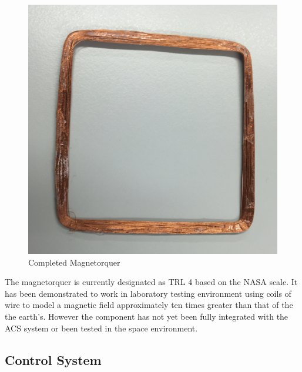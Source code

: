 \vspace{-6mm}
\begin{center}
    \begin{figure}[H]
        \caption{Completed Magnetorquer}
        \vspace{-4mm}
        \centering
        \includegraphics[scale = 0.4]{./figures/Magnetorquer}
    \end{figure}
\end{center}
\vspace{-5mm}
The magnetorquer is currently designated as TRL 4 based on the NASA scale.  It has been demonstrated to work in laboratory testing environment using coils of wire to model a magnetic field approximately ten times greater than that of the the earth's. However the component has not yet been fully integrated with the ACS system or been tested in the space environment.  

\subsection{Control System}

